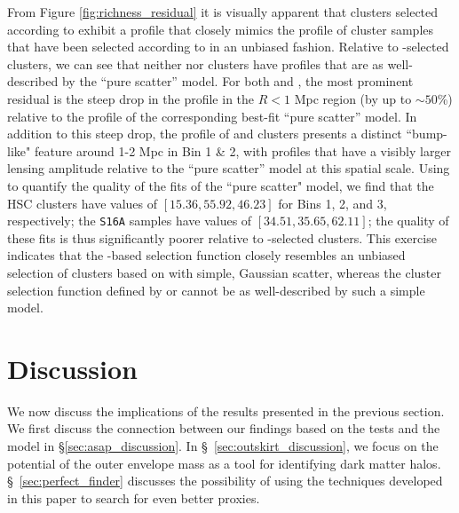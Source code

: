 \documentclass[fleqn,usenatbib,useAMS]{mnras}
\begin{document}
\begin{CJK*}{UTF8}{gbsn}
    From Figure \ref{fig:richness_residual} it is visually apparent that clusters selected according
    to  exhibit a \dsigma{} profile that closely mimics the profile of cluster
    samples that have been selected according to \mvir{} in an unbiased fashion. 
    Relative to -selected clusters, we can see that neither \redm{} nor \camira{}
    clusters have \dsigma{} profiles that are as well-described by the ``pure scatter'' model.
    For both \redm{} and \camira{}, the most prominent residual  is the steep drop in the profile in
    the $R < 1$ Mpc region (by up to $\sim 50$\%) relative to the profile of the corresponding
    best-fit ``pure scatter'' model. 
    In addition to this steep drop, the \dsigma{} profile of \redm{} and \camira{} clusters presents
    a distinct ``bump-like" feature around 1-2 Mpc in Bin 1 \& 2, with profiles that have a visibly
    larger lensing amplitude relative to the ``pure scatter'' model at this spatial scale.  
    Using \chisq{} to quantify the quality of the fits of the ``pure scatter" model, we find that
    the HSC \redm{} clusters have values of $[15.36, 55.92, 46.23]$ for Bins 1, 2, and 3,
    respectively; the \camira{} \texttt{S16A} samples have values of $[34.51, 35.65, 62.11]$; the
    quality of these fits is thus significantly poorer relative to -selected
    clusters. 
    This exercise indicates that the -based selection function closely resembles an
    unbiased selection of clusters based on \mvir{} with simple, Gaussian scatter, whereas the
    cluster selection function defined by \redm{} or \camira{} cannot be as well-described by such a
    simple model.
    
    
    

\section{Discussion}
    \label{sec:discussion}
    
    We now discuss the implications of the results presented in the previous section.
    We first discuss the connection between our findings based on the \topn{} tests  and the \asap{}
    model in \S \ref{sec:asap_discussion}.
    In \S\ \ref{sec:outskirt_discussion}, we focus on the potential of the outer envelope mass as a
    tool for identifying dark matter halos.
    \S\ \ref{sec:perfect_finder} discusses the possibility of using the techniques developed in this
    paper to search for even better \mvir{} proxies. 
    

\end{CJK*}
\end{document}
